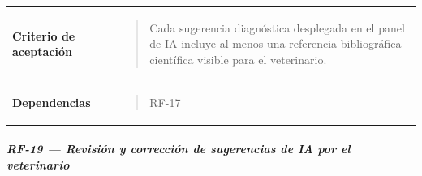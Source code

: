 \documentclass[
]{article}
\begin{document}
{\begin{longtable}[]{@{}
  >{\raggedright\arraybackslash}p{}
  >{\raggedright\arraybackslash}p{}@{}}
\textbf{Criterio de aceptación} &
\begin{minipage}[t]{\linewidth}\raggedright
\begin{quote}
Cada sugerencia diagnóstica desplegada en el panel de IA incluye al
menos una referencia bibliográfica científica visible para el
veterinario.
\end{quote}
\end{minipage} \\
\textbf{Dependencias} & \begin{minipage}[t]{\linewidth}\raggedright
\begin{quote}
RF-17
\end{quote}
\end{minipage} \\
\end{longtable}
}

\subparagraph{RF-19 --- Revisión y corrección de sugerencias de IA por
el
veterinario}\label{rf-19-revisiuxf3n-y-correcciuxf3n-de-sugerencias-de-ia-por-el-veterinario}
\end{document}
